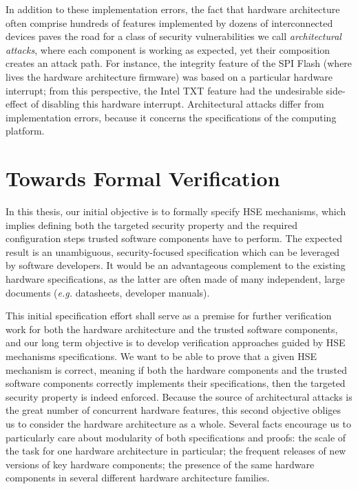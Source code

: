 In addition to these implementation errors, the fact that hardware architecture
often comprise hundreds of features implemented by dozens of interconnected
devices paves the road for a class of security vulnerabilities we call
\emph{architectural attacks}, where each component is working as expected, yet
their composition creates an attack path.
%
For instance, the integrity feature of the SPI Flash (where lives the hardware
architecture firmware) was based on a particular hardware interrupt; from this
perspective, the Intel TXT feature had the undesirable side-effect of disabling
this hardware interrupt.
%
Architectural attacks differ from implementation errors, because it concerns the
specifications of the computing platform.

\section{Towards Formal Verification}

In this thesis, our initial objective is to formally specify HSE mechanisms,
which implies defining both the targeted security property and the required
configuration steps trusted software components have to perform.
%
The expected result is an unambiguous, security-focused specification which can
be leveraged by software developers.
%
It would be an advantageous complement to the existing hardware specifications,
as the latter are often made of many independent, large documents (\emph{e.g.}
datasheets, developer manuals).

This initial specification effort shall serve as a premise for further
verification work for both the hardware architecture and the trusted software
components, and our long term objective is to develop verification approaches
guided by HSE mechanisms specifications.
%
We want to be able to prove that a given HSE mechanism is correct, meaning if
both the hardware components and the trusted software components correctly
implements their specifications, then the targeted security property is indeed
enforced.
%
Because the source of architectural attacks is the great number of concurrent
hardware features, this second objective obliges us to consider the hardware
architecture as a whole.
%
Several facts encourage us to particularly care about modularity of both
specifications and proofs:
%
the scale of the task for one hardware architecture in particular;
%
the frequent releases of new versions of key hardware components;
%
the presence of the same hardware components in several different hardware
architecture families.

